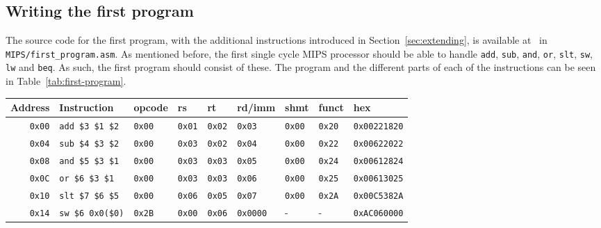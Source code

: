\subsection{Writing the first program}
The source code for the first program, with the additional
instructions introduced in Section~\ref{sec:extending}, is available
at~\cite{ref:github} in \texttt{MIPS/first\_program.asm}.
As mentioned before, the first single cycle MIPS processor should be able to
handle \texttt{add}, \texttt{sub}, \texttt{and}, \texttt{or}, \texttt{slt},
\texttt{sw}, \texttt{lw} and \texttt{beq}. As such, the first program should
consist of these. The program and the different parts of each of the
instructions can be seen in Table~\ref{tab:first-program}.
\begin{table}
    \centering
    \begin{adjustbox}{center}
    \begin{tabular}{rllllllll}
        \hline
        Address & Instruction & opcode & rs & rt & rd/imm & shmt & funct & hex \\
        \hline
        \texttt{0x00} & \texttt{add \$3 \$1 \$2} & \texttt{0x00} &
        \texttt{0x01} & \texttt{0x02} & \texttt{0x03} & \texttt{0x00} &
        \texttt{0x20} & \texttt{0x00221820} \\ %

        \texttt{0x04} & \texttt{sub \$4 \$3 \$2} & \texttt{0x00} &
        \texttt{0x03} & \texttt{0x02} & \texttt{0x04} & \texttt{0x00} &
        \texttt{0x22} & \texttt{0x00622022} \\ %

        \texttt{0x08} & \texttt{and \$5 \$3 \$1} & \texttt{0x00} &
        \texttt{0x03} & \texttt{0x03} & \texttt{0x05} & \texttt{0x00} &
        \texttt{0x24} & \texttt{0x00612824} \\ %

        \texttt{0x0C} & \texttt{or \$6 \$3 \$1} & \texttt{0x00} &
        \texttt{0x03} & \texttt{0x03} & \texttt{0x06} & \texttt{0x00} &
        \texttt{0x25} & \texttt{0x00613025} \\ %

        \texttt{0x10} & \texttt{slt \$7 \$6 \$5} & \texttt{0x00} &
        \texttt{0x06} & \texttt{0x05} & \texttt{0x07} & \texttt{0x00} &
        \texttt{0x2A} & \texttt{0x00C5382A} \\ %

        \texttt{0x14} & \texttt{sw \$6  0x0(\$0)} & \texttt{0x2B} &
        \texttt{0x00} & \texttt{0x06} & \texttt{0x0000} & - &
        - & \texttt{0xAC060000} \\ %


\end{tabular}
\end{adjustbox}
\end{table}
